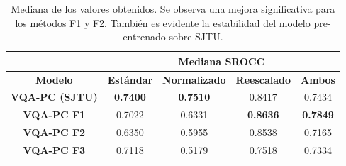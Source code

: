 \begin{table}[htp]
  \scriptsize
  \centering
\begin{tabular}{|c|cccc|}
\hline
\rowcolor[HTML]{FFC702}
                       & \multicolumn{4}{c|}{\textbf{Mediana SROCC}}                                                                                                          \\ \hline
\rowcolor[HTML]{FFC702}
\textbf{Modelo}        & \multicolumn{1}{c|}{\textbf{Estándar}} & \multicolumn{1}{c|}{\textbf{Normalizado}} & \multicolumn{1}{c|}{\textbf{Reescalado}} & \textbf{Ambos}  \\ \hline
\textbf{VQA-PC (SJTU)} & \multicolumn{1}{c|}{\textbf{0.7400}}   & \multicolumn{1}{c|}{\textbf{0.7510}}      & \multicolumn{1}{c|}{0.8417}             & 0.7434          \\ \hline
\textbf{VQA-PC F1}     & \multicolumn{1}{c|}{0.7022}            & \multicolumn{1}{c|}{0.6331}               & \multicolumn{1}{c|}{\textbf{0.8636}}    & \textbf{0.7849} \\ \hline
\textbf{VQA-PC F2}     & \multicolumn{1}{c|}{0.6350}            & \multicolumn{1}{c|}{0.5955}               & \multicolumn{1}{c|}{0.8538}             & 0.7165          \\ \hline
\textbf{VQA-PC F3}     & \multicolumn{1}{c|}{0.7118}            & \multicolumn{1}{c|}{0.5179}               & \multicolumn{1}{c|}{0.7518}             & 0.7334          \\ \hline
\end{tabular}
\caption[Mediana de los valores sobre imágenes médicas.]{
  Mediana de los valores obtenidos. Se observa una mejora significativa para 
  los métodos F1 y F2. También es evidente la estabilidad del modelo pre-entrenado
  sobre SJTU. 
}
\label{tab:PercentileMed}
\end{table}


